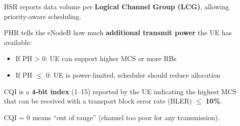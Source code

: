 BSR reports data volume per \textbf{Logical Channel Group (LCG)}, allowing priority-aware scheduling.


PHR tells the eNodeB how much \textbf{additional transmit power} the UE has available:


\begin{itemize}
\tightlist
\item
  If PH \textgreater{} 0: UE can support higher MCS or more RBs
\item
  If PH \ensuremath{\le} 0: UE is power-limited, scheduler should reduce allocation
\end{itemize}






\CNchained{}

CQI is a \textbf{4-bit index} (1–15) reported by the UE indicating the highest MCS that can be received with a transport block error rate (BLER) \ensuremath{\le} \textbf{10\%}.

CQI = 0 means ``out of range'' (channel too poor for any transmission).



